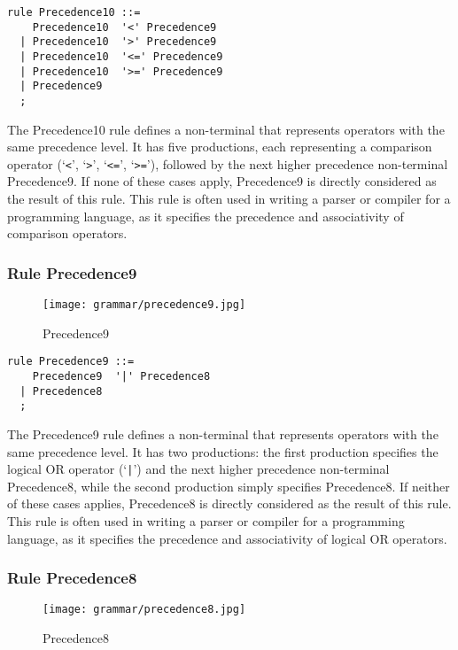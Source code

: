 \begin{lstlisting}
rule Precedence10 ::=
    Precedence10  '<' Precedence9 
  | Precedence10  '>' Precedence9 
  | Precedence10  '<=' Precedence9 
  | Precedence10  '>=' Precedence9 
  | Precedence9 
  ;
\end{lstlisting}

The Precedence10 rule defines a non-terminal that represents operators with the same precedence level. It has five productions, each representing a comparison operator (`\verb|<|', `\verb|>|', `\verb|<=|', `\verb|>=|'), followed by the next higher precedence non-terminal Precedence9. If none of these cases apply, Precedence9 is directly considered as the result of this rule. This rule is often used in writing a parser or compiler for a programming language, as it specifies the precedence and associativity of comparison operators.

\subsubsection*{Rule Precedence9}

\begin{figure}[!ht]
\centering
\texttt{[image: grammar/precedence9.jpg]}
\caption{Precedence9}
\end{figure}

\begin{lstlisting}
rule Precedence9 ::=
    Precedence9  '|' Precedence8 
  | Precedence8 
  ;
\end{lstlisting}

The Precedence9 rule defines a non-terminal that represents operators with the same precedence level. It has two productions: the first production specifies the logical OR operator (`\verb!|!') and the next higher precedence non-terminal Precedence8, while the second production simply specifies Precedence8. If neither of these cases applies, Precedence8 is directly considered as the result of this rule. This rule is often used in writing a parser or compiler for a programming language, as it specifies the precedence and associativity of logical OR operators.

\subsubsection*{Rule Precedence8}

\begin{figure}[!ht]
\centering
\texttt{[image: grammar/precedence8.jpg]}
\caption{Precedence8}
\end{figure}

